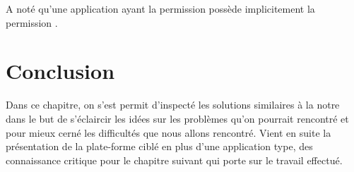 A noté qu'une application ayant la permission  possède implicitement la permission .

\section{Conclusion}

Dans ce chapitre, on s'est permit d'inspecté les solutions similaires à la
notre dans le but de s'éclaircir les idées sur les problèmes qu'on pourrait
rencontré et pour mieux cerné les difficultés que nous allons rencontré. Vient
en suite la présentation de la plate-forme ciblé en plus d'une application
type, des connaissance critique pour le chapitre suivant qui porte sur le
travail effectué.
